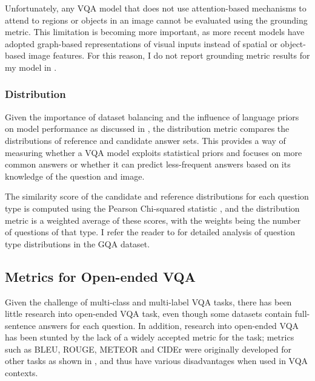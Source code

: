 Unfortunately, any VQA model that does not use attention-based mechanisms to attend to regions or objects in an image cannot be evaluated using the grounding metric. This limitation is becoming more important, as more recent models have adopted graph-based representations of visual inputs instead of spatial or object-based image features. For this reason, I do not report grounding metric results for my model in \chapterautorefname{ \ref{chap:results}}.

\subsubsection{Distribution}

Given the importance of dataset balancing and the influence of language priors on model performance as discussed in \sectionautorefname{ \ref{section:vqa_datasets}}, the distribution metric compares the distributions of reference and candidate answer sets. This provides a way of measuring whether a VQA model exploits statistical priors and focuses on more common answers or whether it can predict less-frequent answers based on its knowledge of the question and image.

The similarity score of the candidate and reference distributions for each question type is computed using the Pearson Chi-squared statistic \cite{pearson1900x}, and the distribution metric is a weighted average of these scores, with the weights being the number of questions of that type. I refer the reader to \cite{hudson2019gqa} for detailed analysis of question type distributions in the GQA dataset.

\subsection{Metrics for Open-ended VQA}
\label{subsection:open_ended_vqa_metrics}

Given the challenge of multi-class and multi-label VQA tasks, there has been little research into open-ended VQA task, even though some datasets contain full-sentence answers for each question. In addition, research into open-ended VQA has been stunted by the lack of a widely accepted metric for the task; metrics such as BLEU, ROUGE, METEOR and CIDEr were originally developed for other tasks as shown in \tableautorefname{ \ref{tab:vqa_metrics_suitability}}, and thus have various disadvantages when used in VQA contexts.

